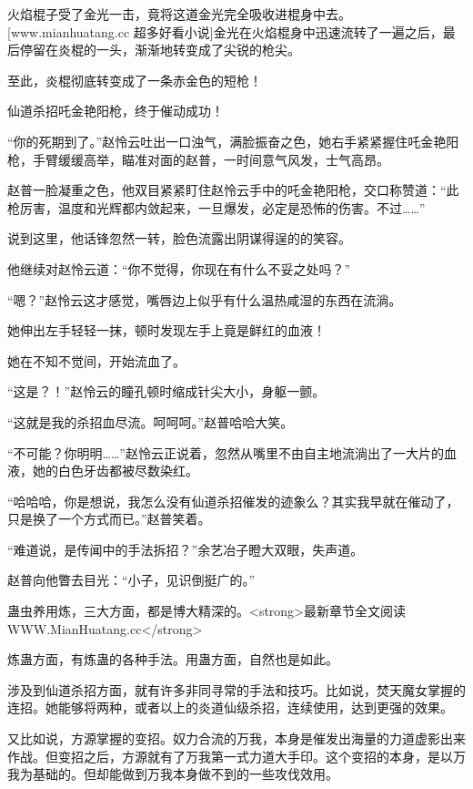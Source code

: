 
\begin{this_body}

火焰棍子受了金光一击，竟将这道金光完全吸收进棍身中去。[www.mianhuatang.cc 超多好看小说]金光在火焰棍身中迅速流转了一遍之后，最后停留在炎棍的一头，渐渐地转变成了尖锐的枪尖。

至此，炎棍彻底转变成了一条赤金色的短枪！

仙道杀招吒金艳阳枪，终于催动成功！

“你的死期到了。”赵怜云吐出一口浊气，满脸振奋之色，她右手紧紧握住吒金艳阳枪，手臂缓缓高举，瞄准对面的赵普，一时间意气风发，士气高昂。

赵普一脸凝重之色，他双目紧紧盯住赵怜云手中的吒金艳阳枪，交口称赞道：“此枪厉害，温度和光辉都内敛起来，一旦爆发，必定是恐怖的伤害。不过……”

说到这里，他话锋忽然一转，脸色流露出阴谋得逞的的笑容。

他继续对赵怜云道：“你不觉得，你现在有什么不妥之处吗？”

“嗯？”赵怜云这才感觉，嘴唇边上似乎有什么温热咸湿的东西在流淌。

她伸出左手轻轻一抹，顿时发现左手上竟是鲜红的血液！

她在不知不觉间，开始流血了。

“这是？！”赵怜云的瞳孔顿时缩成针尖大小，身躯一颤。

“这就是我的杀招血尽流。呵呵呵。”赵普哈哈大笑。

“不可能？你明明……”赵怜云正说着，忽然从嘴里不由自主地流淌出了一大片的血液，她的白色牙齿都被尽数染红。

“哈哈哈，你是想说，我怎么没有仙道杀招催发的迹象么？其实我早就在催动了，只是换了一个方式而已。”赵普笑着。

“难道说，是传闻中的手法拆招？”余艺冶子瞪大双眼，失声道。

赵普向他瞥去目光：“小子，见识倒挺广的。”

蛊虫养用炼，三大方面，都是博大精深的。<strong>最新章节全文阅读WWW.MianHuatang.cc</strong>

炼蛊方面，有炼蛊的各种手法。用蛊方面，自然也是如此。

涉及到仙道杀招方面，就有许多非同寻常的手法和技巧。比如说，焚天魔女掌握的连招。她能够将两种，或者以上的炎道仙级杀招，连续使用，达到更强的效果。

又比如说，方源掌握的变招。奴力合流的万我，本身是催发出海量的力道虚影出来作战。但变招之后，方源就有了万我第一式力道大手印。这个变招的本身，是以万我为基础的。但却能做到万我本身做不到的一些攻伐效用。


\end{this_body}
